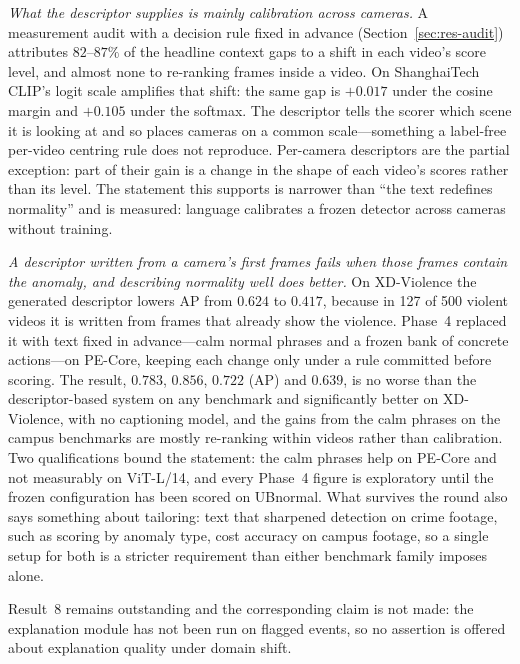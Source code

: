 \documentclass[a4paper,fleqn]{cas-sc}
\begin{document}
\emph{What the descriptor supplies is mainly calibration across cameras.} A
measurement audit with a decision rule fixed in advance
(Section~\ref{sec:res-audit}) attributes $82$--$87\%$ of the headline context
gaps to a shift in each video's score level, and almost none to re-ranking frames
inside a video. On ShanghaiTech CLIP's logit scale amplifies that shift: the
same gap is $+0.017$ under the cosine margin and $+0.105$ under the softmax. The
descriptor tells the scorer which scene it is looking at and so places cameras on
a common scale---something a label-free per-video centring rule does not
reproduce. Per-camera descriptors are the partial exception: part of their gain
is a change in the shape of each video's scores rather than its level. The
statement this supports is narrower than ``the text redefines normality'' and is
measured: language calibrates a frozen detector across cameras without training.

\emph{A descriptor written from a camera's first frames fails when those frames
contain the anomaly, and describing normality well does better.} On XD-Violence
the generated descriptor lowers AP from $0.624$ to $0.417$, because in 127 of 500
violent videos it is written from frames that already show the violence. Phase~4
replaced it with text fixed in advance---calm normal phrases and a frozen bank of
concrete actions---on PE-Core, keeping each change only under a rule committed
before scoring. The result, $0.783$, $0.856$, $0.722$ (AP) and $0.639$, is no worse
than the descriptor-based system on any benchmark and significantly better on
XD-Violence, with no captioning model, and the gains from the calm phrases on the
campus benchmarks are mostly re-ranking within videos rather than calibration.
Two qualifications bound the statement: the calm phrases help on PE-Core and not
measurably on ViT-L/14, and every Phase~4 figure is exploratory until the frozen
configuration has been scored on UBnormal. What survives the round also says
something about tailoring: text that sharpened detection on crime footage, such as
scoring by anomaly type, cost accuracy on campus footage, so a single setup for
both is a stricter requirement than either benchmark family imposes alone.

Result~8 remains outstanding and the corresponding claim is not made: the
explanation module has not been run on flagged events, so no assertion is
offered about explanation quality under domain shift.
\end{document}

